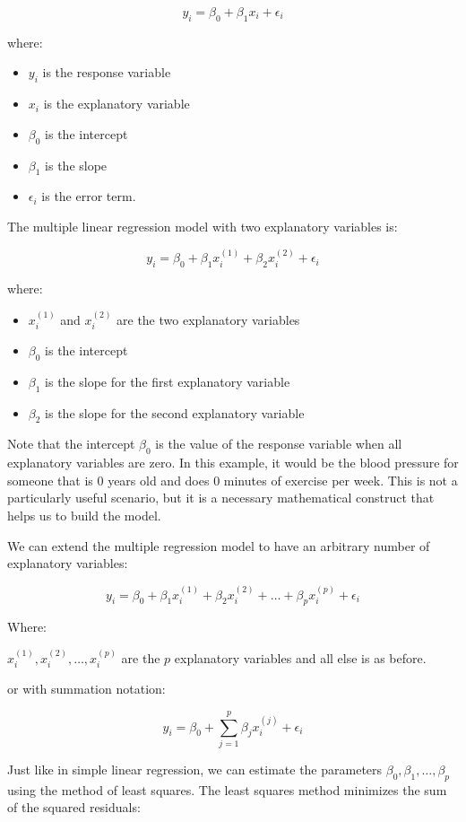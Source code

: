 \documentclass[
  letterpaper,
  8pt,
  a4paper]{book}
\providecommand{\tightlist}{%
  \setlength{\itemsep}{0pt}\setlength{\parskip}{0pt}}
\begin{document}
\[y_i = \beta_0 + \beta_1 x_i + \epsilon_i\]

where:

\begin{itemize}
\tightlist
\item
  \(y_i\) is the response variable
\item
  \(x_i\) is the explanatory variable
\item
  \(\beta_0\) is the intercept
\item
  \(\beta_1\) is the slope
\item
  \(\epsilon_i\) is the error term.
\end{itemize}

The multiple linear regression model with two explanatory variables is:

\[y_i = \beta_0 + \beta_1 x_i^{(1)} + \beta_2 x_i^{(2)} + \epsilon_i\]

where:

\begin{itemize}
\tightlist
\item
  \(x_i^{(1)}\) and \(x_i^{(2)}\) are the two explanatory variables
\item
  \(\beta_0\) is the intercept
\item
  \(\beta_1\) is the slope for the first explanatory variable
\item
  \(\beta_2\) is the slope for the second explanatory variable
\end{itemize}

Note that the intercept \(\beta_0\) is the value of the response
variable when all explanatory variables are zero. In this example, it
would be the blood pressure for someone that is 0 years old and does 0
minutes of exercise per week. This is not a particularly useful
scenario, but it is a necessary mathematical construct that helps us to
build the model.

We can extend the multiple regression model to have an arbitrary number
of explanatory variables:

\[y_i = \beta_0 + \beta_1 x_i^{(1)} + \beta_2 x_i^{(2)} + \ldots + \beta_p x_i^{(p)} + \epsilon_i\]

Where:

\(x_i^{(1)}, x_i^{(2)}, \ldots, x_i^{(p)}\) are the \(p\) explanatory
variables and all else is as before.

or with summation notation:

\[y_i = \beta_0 + \sum_{j=1}^p \beta_j x_i^{(j)} + \epsilon_i\]

Just like in simple linear regression, we can estimate the parameters
\(\beta_0, \beta_1, \ldots, \beta_p\) using the method of least squares.
The least squares method minimizes the sum of the squared residuals:
\end{document}

